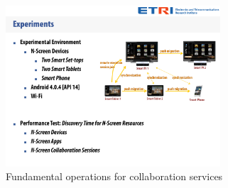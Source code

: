 \documentclass{sig-alternate}
\begin{document}
 \begin{figure}[htb] %
 \centering
 \includegraphics[width=8cm,keepaspectratio]{concepts}
 \caption{Fundamental operations for collaboration services}
 \label{fig:concepts}
 \end{figure}
\end{document}
